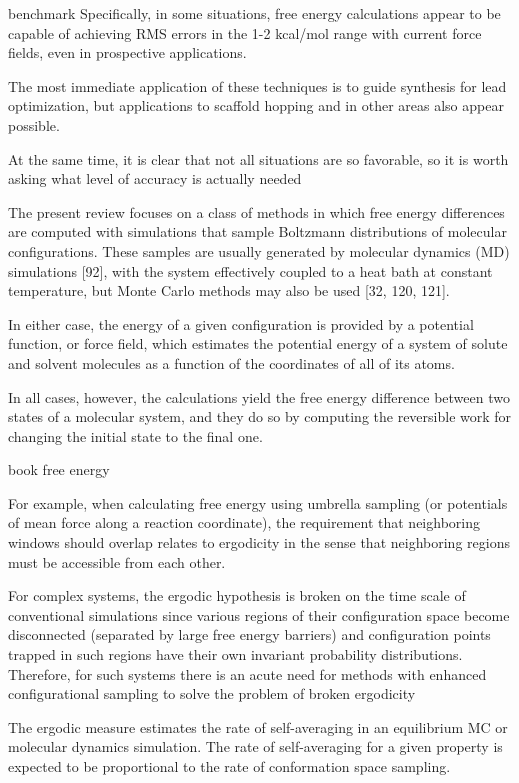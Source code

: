 benchmark
Specifically, in some
situations, free energy calculations appear to be capable
of achieving RMS errors in the 1-2 kcal/mol range with
current force fields, even in prospective applications.

The most immediate application of these techniques is to guide synthesis for lead optimization, but applications to scaffold
hopping and in other areas also appear possible.

At the same time, it is clear that not all situations are
so favorable, so it is worth asking what level of accuracy
is actually needed

The present review focuses on a class of methods in
which free energy differences are computed with simulations that sample Boltzmann distributions of molecular configurations. These samples are usually generated by molecular dynamics (MD) simulations [92], with
the system effectively coupled to a heat bath at constant temperature, but Monte Carlo methods may also
be used [32, 120, 121]. 

In either case, the energy of a
given configuration is provided by a potential function,
or force field, which estimates the potential energy of
a system of solute and solvent molecules as a function
of the coordinates of all of its atoms.

In all cases, however, the calculations yield the free energy
difference between two states of a molecular system, and
they do so by computing the reversible work for changing
the initial state to the final one. 

book free energy

For example, when calculating free energy using umbrella sampling (or potentials of mean force along a reaction coordinate), the requirement that neighboring windows should overlap relates to ergodicity in the sense that neighboring regions must be accessible from each other.

For complex systems, the ergodic hypothesis is broken on the time scale of conventional simulations since various regions of their configuration space become disconnected (separated by large free energy barriers) and configuration points trapped in such regions have their own invariant probability distributions. Therefore, for such systems there is an acute need for methods with enhanced configurational sampling to solve the problem of broken ergodicity

The ergodic measure estimates the rate of self-averaging in an equilibrium MC or molecular dynamics simulation.
The rate of self-averaging for a given property is expected to be proportional to the rate of conformation space sampling. 